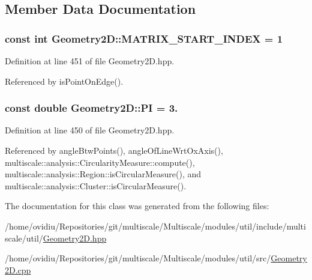 \subsection{\-Member \-Data \-Documentation}
\hypertarget{classmultiscale_1_1Geometry2D_ade1d55d3ef110b73d42a3e4c4360ba17}{
\subsubsection[{\-M\-A\-T\-R\-I\-X\-\_\-\-S\-T\-A\-R\-T\-\_\-\-I\-N\-D\-E\-X}]{\setlength{\rightskip}{0pt plus 5cm}const int {\bf \-Geometry2\-D\-::\-M\-A\-T\-R\-I\-X\-\_\-\-S\-T\-A\-R\-T\-\_\-\-I\-N\-D\-E\-X} = 1}}\label{classmultiscale_1_1Geometry2D_ade1d55d3ef110b73d42a3e4c4360ba17}


\-Definition at line 451 of file \-Geometry2\-D.\-hpp.



\-Referenced by is\-Point\-On\-Edge().

\hypertarget{classmultiscale_1_1Geometry2D_a7039b8bbe89283e22744c0631d597660}{
\subsubsection[{\-P\-I}]{\setlength{\rightskip}{0pt plus 5cm}const double {\bf \-Geometry2\-D\-::\-P\-I} = 3.}}\label{classmultiscale_1_1Geometry2D_a7039b8bbe89283e22744c0631d597660}


\-Definition at line 450 of file \-Geometry2\-D.\-hpp.



\-Referenced by angle\-Btw\-Points(), angle\-Of\-Line\-Wrt\-Ox\-Axis(), multiscale\-::analysis\-::\-Circularity\-Measure\-::compute(), multiscale\-::analysis\-::\-Region\-::is\-Circular\-Measure(), and multiscale\-::analysis\-::\-Cluster\-::is\-Circular\-Measure().



\-The documentation for this class was generated from the following files\-:\begin{DoxyCompactItemize}
\item 
/home/ovidiu/\-Repositories/git/multiscale/\-Multiscale/modules/util/include/multiscale/util/\hyperlink{Geometry2D_8hpp}{\-Geometry2\-D.\-hpp}\item 
/home/ovidiu/\-Repositories/git/multiscale/\-Multiscale/modules/util/src/\hyperlink{Geometry2D_8cpp}{\-Geometry2\-D.\-cpp}\end{DoxyCompactItemize}
